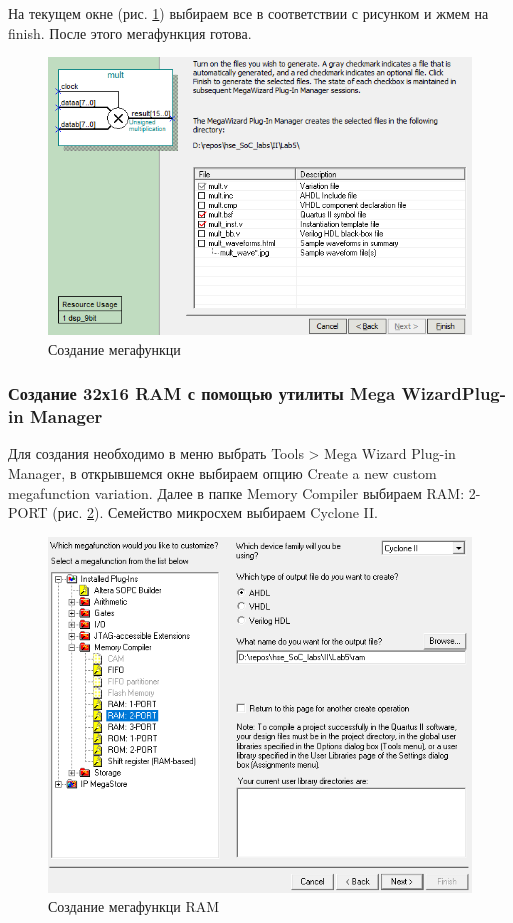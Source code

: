 \documentclass[a4paper,14pt]{article}
\begin{document}
На текущем окне (рис. \ref{fig:screenshot423}) выбираем все в соответствии с рисунком и жмем на finish. После этого мегафункция готова.

\begin{figure}[H]
	\centering
	\includegraphics[width=0.7\linewidth]{image/lab5/Screenshot_423}
	\caption{Создание мегафункци}
	\label{fig:screenshot423}
\end{figure}

\subsubsection{Создание 32х16 RAM с помощью утилиты Mega Wizard\textregistered  Plug-in Manager}

Для создания необходимо в меню выбрать Tools > Mega Wizard  Plug-in Manager, в открывшемся окне выбираем опцию Create a new custom megafunction variation. Далее в папке Memory Compiler выбираем RAM: 2-PORT (рис. \ref{fig:screenshot004}). Семейство микросхем выбираем Cyclone II.

\begin{figure}[H]
	\centering
	\includegraphics[width=0.7\linewidth]{image/lab5/screenshot004}
	\caption{Создание мегафункци RAM}
	\label{fig:screenshot004}
\end{figure}
\end{document}
